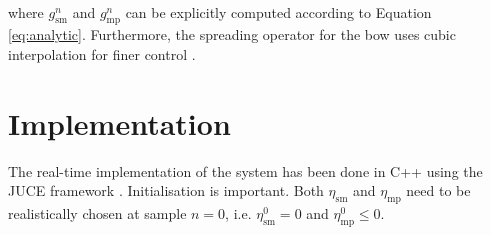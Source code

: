 \documentclass[dvipsnames, pdftex]{article}
\begin{document}
\\
where $g^n_\text{sm}$ and $g^n_\text{mp}$ can be explicitly computed according to Equation \eqref{eq:analytic}. Furthermore, the spreading operator for the bow uses cubic interpolation for finer control \cite{Bilbao2009:NumericalSoundSynthesis}.
\section{Implementation}
The real-time implementation of the system has been done in C++ using the JUCE framework \cite{JUCE2020}.
Initialisation is important. Both $\eta_\text{sm}$ and $\eta_\text{mp}$ need to be realistically chosen at sample $n=0$, i.e. $\eta_\text{sm}^0 = 0$ and $\eta_\text{mp}^0 \leq 0$.
\end{document}
